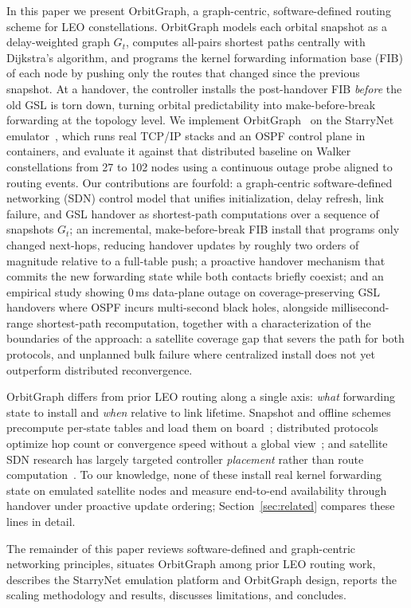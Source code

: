 In this paper we present OrbitGraph, a graph-centric, software-defined routing
scheme for LEO constellations.
OrbitGraph models each orbital snapshot as a delay-weighted graph $G_t$, computes
all-pairs shortest paths centrally with Dijkstra's algorithm, and programs the
kernel forwarding information base (FIB) of each node by pushing only the routes
that changed since the previous snapshot.
At a handover, the controller installs the post-handover FIB \emph{before} the
old GSL is torn down, turning orbital predictability into make-before-break
forwarding at the topology level.
We implement OrbitGraph~\cite{online:orbitgraph:2025} on the StarryNet emulator~\cite{lai2023starrynet}, which
runs real TCP/IP stacks and an OSPF control plane in containers, and evaluate it
against that distributed baseline on Walker constellations from 27 to 102 nodes
using a continuous outage probe aligned to routing events.
Our contributions are fourfold: a graph-centric software-defined networking
(SDN) control model that unifies initialization, delay refresh, link failure,
and GSL handover as shortest-path computations over a sequence of snapshots
$G_t$; an incremental, make-before-break FIB install that programs only changed
next-hops, reducing handover updates by roughly two orders of magnitude relative
to a full-table push; a proactive handover mechanism that commits the new
forwarding state while both contacts briefly coexist; and an empirical study
showing 0\,ms data-plane outage on coverage-preserving GSL handovers where OSPF
incurs multi-second black holes, alongside millisecond-range shortest-path
recomputation, together with a characterization of the boundaries of the
approach: a satellite coverage gap that severs the path for both protocols, and
unplanned bulk failure where centralized install does not yet outperform
distributed reconvergence.

OrbitGraph differs from prior LEO routing along a single axis: \emph{what}
forwarding state to install and \emph{when} relative to link lifetime.
Snapshot and offline schemes precompute per-state tables and load them on
board~\cite{seong:topological-design:1995}; distributed protocols optimize hop
count or convergence speed without a global view~\cite{gregory:satellite-routing:2022,
pam:opspf:2019}; and satellite SDN research has largely targeted controller
\emph{placement} rather than route computation~\cite{papa:sdn-cpp:2018,
guo:spda:2022}.
To our knowledge, none of these install real kernel forwarding state on emulated
satellite nodes and measure end-to-end availability through handover under
proactive update ordering; Section~\ref{sec:related} compares these lines in
detail.

The remainder of this paper reviews software-defined and graph-centric
networking principles, situates OrbitGraph among prior LEO routing work,
describes the StarryNet emulation platform and OrbitGraph design, reports the
scaling methodology and results, discusses limitations, and concludes.
